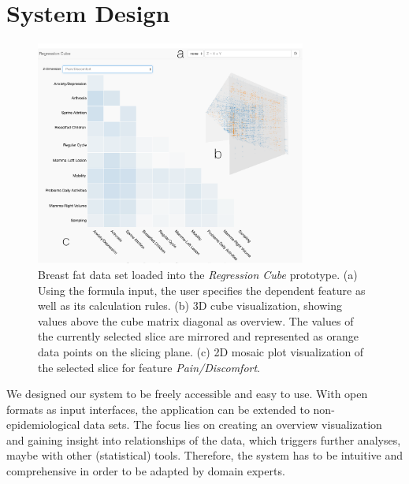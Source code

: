 \documentclass[journal]{style/vgtc} 			          %
\newcommand{\com}[1]{\textcolor{orange}{\uline{#1}}}
\begin{document}
\section{System Design} \label{sec:SystemDesign}
\begin{figure}[htb]
 \centering
 \includegraphics[width=3.5in]{figures/system}
 \caption{
 Breast fat data set loaded into the \emph{Regression Cube} prototype.
 (a) Using the formula input, the user specifies the dependent feature as well as its calculation rules.
 (b) 3D cube visualization, showing values above the cube matrix diagonal as overview.
 The values of the currently selected slice are mirrored and represented as orange data points on the slicing plane.
 (c) 2D mosaic plot visualization of the selected slice for feature \emph{Pain/Discomfort}.
 }
  \label{fig:System}
\end{figure}
We designed our system to be freely accessible and easy to use.
With open formats as input interfaces, the application can be extended to non-epidemiological data sets.
The focus lies on creating an overview visualization and gaining insight into relationships of the data, which triggers further analyses, maybe with other (statistical) tools.
Therefore, the system has to be intuitive and comprehensive in order to be adapted by domain experts.
\\\\
\end{document}
